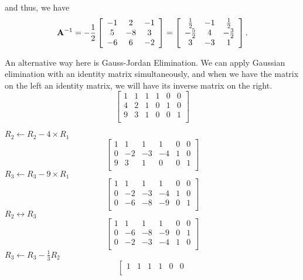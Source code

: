 \documentclass[12pt,a4paper]{article}
\begin{document}
\begin{solution}
and thus, we have 
\[
\mathbf{A}^{-1} = -\frac{1}{2} 
\left[
\begin{array}{ccc}
 -1 & 2 & -1 \\
 5 & -8 & 3 \\
 -6 & 6 & -2 \\
\end{array}
\right]
=
\left[
\begin{array}{ccc}
 \frac{1}{2} & -1 & \frac{1}{2} \\
 -\frac{5}{2} & 4 & -\frac{3}{2} \\
 3 & -3 & 1 \\
\end{array}
\right].
\]
\begin{remark}
An alternative way here is Gauss-Jordan Elimination. We can apply Gaussian elimination with an identity matrix simultaneously, and when we have the matrix on the left an identity matrix, we will have its inverse matrix on the right.
\[
\left[
\begin{array}{ccc|ccc}
 1 & 1 & 1 & 1 & 0 & 0 \\
 4 & 2 & 1 & 0 & 1 & 0 \\
 9 & 3 & 1 & 0 & 0 & 1 \\
\end{array}
\right]
\]
\begin{center}
$R_2 \leftarrow R_2 - 4\times R_1$
\[
\left[
\begin{array}{ccc|ccc}
 1 & 1 & 1 & 1 & 0 & 0 \\
 0 & -2 & -3 & -4 & 1 & 0 \\
 9 & 3 & 1 & 0 & 0 & 1 \\
\end{array}
\right]
\]
$R_3 \leftarrow R_3 - 9\times R_1$
\[
\left[
\begin{array}{ccc|ccc}
 1 & 1 & 1 & 1 & 0 & 0 \\
 0 & -2 & -3 & -4 & 1 & 0 \\
 0 & -6 & -8 & -9 & 0 & 1 \\
\end{array}
\right]
\]
$R_2 \leftrightarrow R_3$
\[
\left[
\begin{array}{ccc|ccc}
 1 & 1 & 1 & 1 & 0 & 0 \\
 0 & -6 & -8 & -9 & 0 & 1 \\
 0 & -2 & -3 & -4 & 1 & 0 \\
\end{array}
\right]
\]
$R_3 \leftarrow R_3 - \frac{1}{3} R_2$
\[
\left[
\begin{array}{ccc|ccc}
 1 & 1 & 1 & 1 & 0 & 0 \\

\end{array}\]
\end{center}
\end{remark}
\end{solution}
\end{document}
